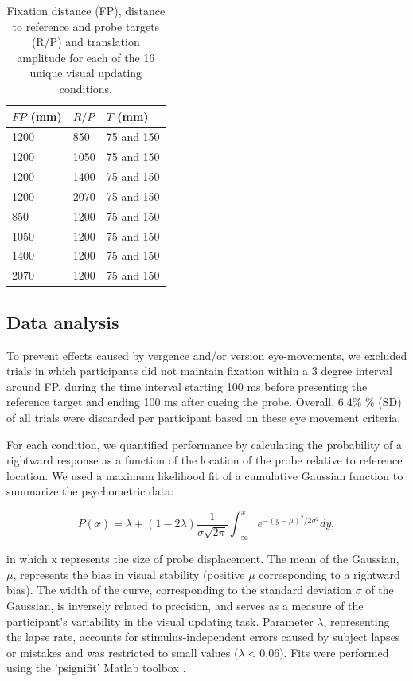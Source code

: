\begin{table}    
    \begin{tabular}{lll}
    $FP$ (mm) & $R/P$ & $T$ (mm) \\
    \hline
    1200 & 850 & 75 and 150 \\
    1200 & 1050 & 75 and 150 \\
    1200 & 1400 & 75 and 150 \\
    1200 & 2070 & 75 and 150 \\
    850 & 1200 & 75 and 150 \\    
    1050 & 1200 & 75 and 150 \\
    1400 & 1200 & 75 and 150 \\
    2070 & 1200 & 75 and 150 \\
    \end{tabular}
    
    \caption{Fixation distance (FP), distance to reference and probe targets (R/P) and translation amplitude for each of the 16 unique visual updating conditions.}
    
    \label{p2:tab1}
\end{table}

\subsection{Data analysis}

To prevent effects caused by vergence and/or version eye-movements, we excluded trials in which participants did not maintain fixation within a 3 degree interval around FP, during the time interval starting 100 \si{\milli\second} before presenting the reference target and ending 100 \si{\milli\second} after cueing the probe. Overall, 6.4\% \% ({\textpm}SD) of all trials were discarded per participant based on these eye movement criteria. 

For each condition, we quantified performance by calculating the probability of a rightward response as a function of the location of the probe relative to reference location. We used a maximum likelihood fit of a cumulative Gaussian function to summarize the psychometric data:

\begin{equation}
\label{p2:eq1}
P(x) = \lambda + (1 - 2\lambda) \frac{1}{\sigma \sqrt{2\pi}} \int_{-\infty}^{x}{e^{-(y-\mu)^2 / 2\sigma^2}}dy,
\end{equation}

in which x represents the size of probe displacement. The mean of the Gaussian, $\mu$, represents the bias in visual stability (positive $\mu$ corresponding to a rightward bias). The width of the curve, corresponding to the standard deviation $\sigma$ of the Gaussian, is inversely related to precision, and serves as a measure of the participant's variability in the visual updating task. Parameter $\lambda$, representing the lapse rate, accounts for stimulus-independent errors caused by subject lapses or mistakes and was restricted to small values ($\lambda < 0.06$). Fits were performed using the 'psignifit' Matlab toolbox \cite{wichmann2001, wichmann2001b}.


